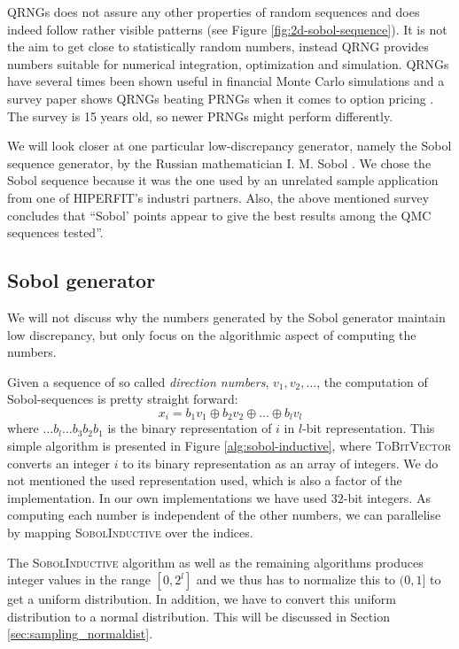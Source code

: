 QRNGs does not assure any other properties of random sequences and
does indeed follow rather visible patterns (see Figure
\ref{fig:2d-sobol-sequence}). It is not the aim to get close to
statistically random numbers, instead QRNG provides numbers suitable
for numerical integration, optimization and simulation. QRNGs have
several times been shown useful in financial Monte Carlo simulations
\cite{chaudhary2005american, couffignals2010quasi,
  dfine2009americanbasket}  and a survey paper shows QRNGs beating PRNGs
when it comes to option pricing \cite{acworth1998comparison}. The
survey is 15 years old, so newer PRNGs  might perform differently.

We will look closer at one particular low-discrepancy generator,
namely the Sobol sequence generator, by the Russian mathematician
I. M. Sobol \cite{sobol1967}. We chose the Sobol sequence because it
was the one used by an unrelated sample application from one of
HIPERFIT's industri partners. Also, the above mentioned survey
concludes that ``Sobol' points appear to give the best results among
the QMC sequences tested''.

\subsection{Sobol generator}
\label{sec:sobol}
We will not discuss why the numbers generated by the Sobol generator
maintain low discrepancy, but only focus on the algorithmic aspect of
computing the numbers.

Given a sequence of so called \emph{direction numbers}, $v_1, v_2,
\ldots$, the computation of Sobol-sequences is pretty straight forward:
$$x_i = b_1v_1 \oplus b_2v_2 \oplus \ldots \oplus b_lv_l$$
where $\ldots b_l\ldots b_3b_2b_1$ is the binary representation of $i$
in $l$-bit representation. This simple algorithm is presented in
Figure \ref{alg:sobol-inductive}, where \textsc{ToBitVector} converts
an integer $i$ to its binary representation as an array of
integers. We do not mentioned the used representation used, which is
also a factor of the implementation. In our own implementations we
have used $32$-bit integers. As computing each number is independent
of the other numbers, we can parallelise by mapping
\textsc{SobolInductive} over the indices.

The \textsc{SobolInductive} algorithm as well as the remaining
algorithms produces integer values in the range $[0, 2^l]$ and we thus
has to normalize this to $(0,1]$ to get a uniform distribution. In
addition, we have to convert this uniform distribution to a normal
distribution. This will be discussed in Section
\ref{sec:sampling_normaldist}.

